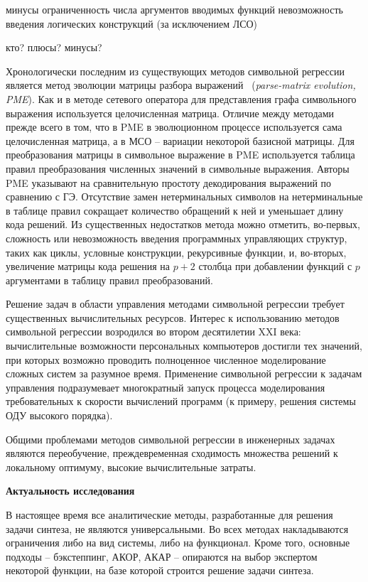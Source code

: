 минусы
ограниченность числа аргументов вводимых функций
невозможность введения логических конструкций (за исключением ЛСО)

кто?
плюсы?
минусы?

Хронологически последним из существующих методов символьной регрессии является метод эволюции матрицы разбора выражений~\cite{Luo2012} (\textit{parse-matrix evolution, PME}).
Как и в методе сетевого оператора для представления графа символьного выражения используется целочисленная матрица.
Отличие между методами прежде всего в том, что в PME в эволюционном процессе используется сама целочисленная матрица, а в МСО -- вариации некоторой базисной матрицы.
Для преобразования матрицы в символьное выражение в PME используется таблица правил преобразования численных значений в символьные выражения.
Авторы PME указывают на сравнительную простоту декодирования выражений по сравнению с ГЭ.
Отсутствие замен нетерминальных символов на нетерминальные в таблице правил сокращает количество обращений к ней и уменьшает длину кода решений.
Из существенных недостатков метода можно отметить, во-первых, сложность или невозможность введения программных управляющих структур, таких как циклы, условные конструкции, рекурсивные функции, и, во-вторых, увеличение матрицы кода решения на $p+2$ столбца при добавлении функций с $p$ аргументами в таблицу правил преобразований.

Решение задач в области управления методами символьной регрессии требует существенных вычислительных ресурсов.
Интерес к использованию методов символьной регрессии возродился во втором десятилетии XXI века: вычислительные возможности персональных компьютеров достигли тех значений, при которых возможно проводить полноценное численное моделирование сложных систем за разумное время.
Применение символьной регрессии к задачам управления подразумевает многократный запуск процесса моделирования требовательных к скорости вычислений программ (к примеру, решения системы ОДУ высокого порядка).

Общими проблемами методов символьной регрессии в инженерных задачах являются переобучение, преждевременная сходимость множества решений к локальному оптимуму, высокие вычислительные затраты.

\textbf{Актуальность исследования}

В настоящее время все аналитические методы, разработанные для решения задачи синтеза, не являются универсальными. Во всех методах накладываются ограничения либо на вид системы, либо на функционал. Кроме того, основные подходы -- бэкстеппинг, АКОР, АКАР -- опираются на выбор экспертом некоторой функции, на базе которой строится решение задачи синтеза.

